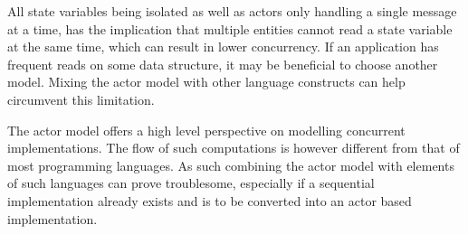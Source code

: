 All state variables being isolated as well as actors only handling a single message at a time, has the implication that multiple entities cannot read a state variable at the same time, which can result in lower concurrency. If an application has frequent reads on some data structure, it may be beneficial to choose another model. Mixing the actor model with other language constructs can help circumvent this limitation.%

The actor model offers a high level perspective on modelling concurrent implementations. The flow of such computations is however different from that of most programming languages. As such combining the actor model with elements of such languages can prove troublesome, especially if a sequential implementation already exists and is to be converted into an actor based implementation.






